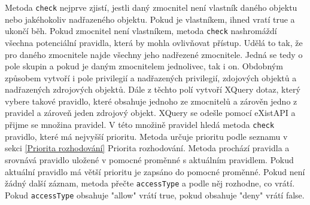 Metoda \verb|check| nejprve zjistí, jestli daný zmocnitel není vlastník daného objektu nebo jakéhokoliv nadřazeného objektu. Pokud je vlastníkem, ihned vratí true a ukončí běh. 
Pokud zmocnitel není vlastníkem, metoda \verb|check| nashromáždí všechna potenciální pravidla, která by mohla ovlivňovat přístup. Udělá to tak, že pro daného zmocnitele najde všechny jeho nadřezené zmocnitele. Jedná se tedy o pole skupin a pokud je daným zmocnitelem jednolivec, tak i on. Obdobným způsobem vytvoří i pole privilegií a nadřazených privilegií, zdojových objektů a nadřazených zdrojových objektů. Dále z těchto polí vytvoří XQuery dotaz, který vybere takové pravidlo, které obsahuje jednoho ze zmocnitelů a zárověn jedno z pravidel a zároveň jeden zdrojový objekt. XQuery se odešle pomocí eXistAPI a přijme se množina pravidel. V této množině pravidel hledá metoda \verb|check| pravidlo, které má nejvyšší prioritu. Metoda určuje prioritu podle seznamu v sekci \ref{Priorita rozhodování} Priorita rozhodování. Metoda prochází pravidla a srovnává pravidlo uložené v pomocné proměnné s aktuálním pravidlem. Pokud aktuální pravidlo má větší prioritu je zapsáno do pomocné proměnné. Pokud není žádný další záznam, metoda přečte \verb|accessType| a podle něj rozhodne, co vrátí. Pokud \verb|accessType| obsahuje "allow" vrátí true, pokud obsahuje "deny" vrátí false.
